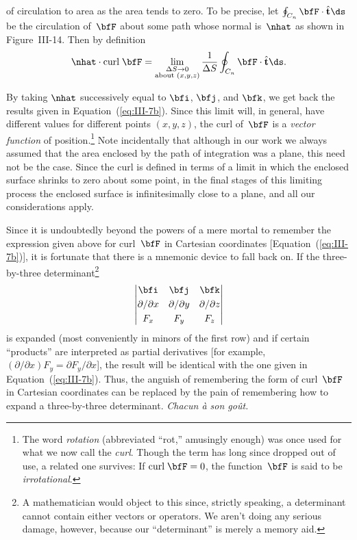 \noindent of circulation to area as the area tends to zero.  To be
precise, let $\oint_{C_n}\bfF\cdot\hat{\mathbf{t}}\ds$ be the
circulation of~$\bfF$ about some path whose normal is~$\nhat$ as shown
in Figure~III-14.  Then by definition
\begin{equation}
  \nhat\cdot\text{curl}\;\bfF
  = \lim_{\substack{\Delta S\to 0 \\ \text{about }(x,y,z)}}
    \frac{1}{\Delta S}\oint_{C_n}\bfF\cdot\hat{\mathbf{t}}\ds.
  \label{eq:III-8}
\end{equation}

By taking $\nhat$ successively equal to $\bfi$, $\bfj$, and $\bfk$, we
get back the results given in Equation~(\ref{eq:III-7b}).  Since this
limit will, in general, have different values for different points
$(x,y,z)$, the curl of~$\bfF$ is a \emph{vector function} of
position.\footnote{The word \emph{rotation} (abbreviated ``rot,''
amusingly enough) was once used for what we now call the \emph{curl}.
Though the term has long since dropped out of use, a related one
survives: If $\text{curl}\;\bfF=0$, the function~$\bfF$ is said to be
\emph{irrotational}.}  Note incidentally that although in our work we
always assumed that the area enclosed by the path of integration was a
plane, this need not be the case.  Since the curl is defined in terms of
a limit in which the enclosed surface shrinks to zero about some point,
in the final stages of this limiting process the enclosed surface is
infinitesimally close to a plane, and all our considerations apply.

Since it is undoubtedly beyond the powers of a mere mortal to
remember the expression given above for curl~$\bfF$ in Cartesian
coordinates [Equation~(\ref{eq:III-7b})], it is fortunate that there is
a mnemonic device to fall back on.  If the three-by-three
determinant\footnote{A mathematician would object to this since,
strictly speaking, a determinant cannot contain either vectors or
operators.  We aren't doing any serious damage, however, because our
``determinant'' is merely a memory aid.}
\[
  \begin{vmatrix}
    \bfi & \bfj & \bfk \\[3pt]
    \partial/\partial x & \partial/\partial y & \partial/\partial z \\[3pt]
    F_x & F_y & F_z
  \end{vmatrix}
\]
is expanded (most conveniently in minors of the first row) and if
certain ``products'' are interpreted as partial derivatives [for example,
$(\partial/\partial x)F_y = \partial F_y/\partial x$], the result will
be identical with the one given in Equation~(\ref{eq:III-7b}).  Thus,
the anguish of remembering the form of curl~$\bfF$ in Cartesian
coordinates can be replaced by the pain of remembering how to expand a
three-by-three determinant.  \emph{Chacun \`a son go\^ut.}

